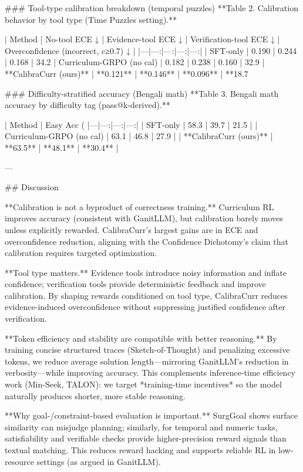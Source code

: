 ### Tool-type calibration breakdown (temporal puzzles)  
**Table 2. Calibration behavior by tool type (Time Puzzles setting).**

| Method | No-tool ECE ↓ | Evidence-tool ECE ↓ | Verification-tool ECE ↓ | Overconfidence (incorrect, c≥0.7) ↓ |
|---|---:|---:|---:|---:|
| SFT-only | 0.190 | 0.244 | 0.168 | 34.2%
| Curriculum-GRPO (no cal) | 0.182 | 0.238 | 0.160 | 32.9%
| **CalibraCurr (ours)** | **0.121** | **0.146** | **0.096** | **18.7%

### Difficulty-stratified accuracy (Bengali math)  
**Table 3. Bengali math accuracy by difficulty tag (pass@k-derived).**

| Method | Easy Acc (%
|---|---:|---:|---:|
| SFT-only | 58.3 | 39.7 | 21.5 |
| Curriculum-GRPO (no cal) | 63.1 | 46.8 | 27.9 |
| **CalibraCurr (ours)** | **63.5** | **48.1** | **30.4** |

---

## Discussion  

**Calibration is not a byproduct of correctness training.** Curriculum RL improves accuracy (consistent with GanitLLM), but calibration barely moves unless explicitly rewarded. CalibraCurr’s largest gains are in ECE and overconfidence reduction, aligning with the Confidence Dichotomy’s claim that calibration requires targeted optimization.

**Tool type matters.** Evidence tools introduce noisy information and inflate confidence; verification tools provide deterministic feedback and improve calibration. By shaping rewards conditioned on tool type, CalibraCurr reduces evidence-induced overconfidence without suppressing justified confidence after verification.

**Token efficiency and stability are compatible with better reasoning.** By training concise structured traces (Sketch-of-Thought) and penalizing excessive tokens, we reduce average solution length—mirroring GanitLLM’s reduction in verbosity—while improving accuracy. This complements inference-time efficiency work (Min-Seek, TALON): we target *training-time incentives* so the model naturally produces shorter, more stable reasoning.

**Why goal-/constraint-based evaluation is important.** SurgGoal shows surface similarity can misjudge planning; similarly, for temporal and numeric tasks, satisfiability and verifiable checks provide higher-precision reward signals than textual matching. This reduces reward hacking and supports reliable RL in low-resource settings (as argued in GanitLLM).

